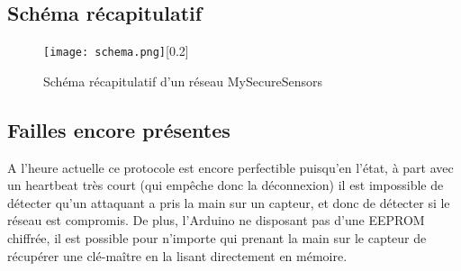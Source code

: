 \documentclass[12 pt]{report}
\begin{document}
\begin{appendix}
\subsection{Schéma récapitulatif}
\begin{figure}[h]
\center
\texttt{[image: schema.png]}[0.2]
\caption{Schéma récapitulatif d'un réseau MySecureSensors}
\end{figure}
\subsection{Failles encore présentes}
A l'heure actuelle ce protocole est encore perfectible puisqu'en l'état, à part avec un heartbeat très court (qui empêche donc la déconnexion) il est impossible de détecter qu'un attaquant a pris la main sur un capteur, et donc de détecter si le réseau est compromis. De plus, l'Arduino ne disposant pas d'une EEPROM chiffrée, il est possible pour n'importe qui prenant la main sur le capteur de récupérer une clé-maître en la lisant directement en mémoire.

\end{appendix}
\end{document}
